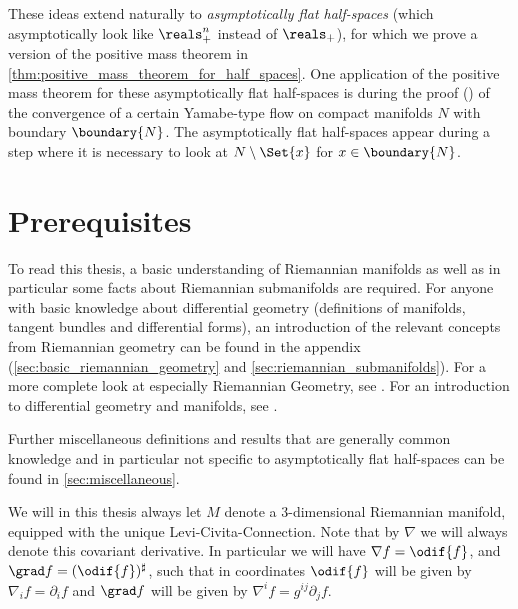 \documentclass[titlepage,numbers=noenddot,oneside,%
cleardoublepage=empty,paper=a4,fontsize=11pt,%
english,%
]{scrartcl}
\begin{document}
These ideas extend naturally to \emph{asymptotically flat half-spaces} (which asymptotically look like \( \reals^n_+ \) instead of \( \reals_+ \)), for which we prove a version of the positive mass theorem in \cref{thm:positive_mass_theorem_for_half_spaces}. One application of the positive mass theorem for these asymptotically flat half-spaces is during the proof (\cite{almarazConvergenceScalarflatMetrics2015}) of the convergence of a  certain Yamabe-type flow on compact manifolds \( N \) with boundary \( \boundary{N} \). The asymptotically flat half-spaces appear during a step where it is necessary to look at \( N\setminus \Set{x} \) for \( x\in \boundary{N} \). 

\section{Prerequisites}
To read this thesis, a basic understanding of Riemannian manifolds as well as in particular some facts about Riemannian submanifolds are required. For anyone with basic knowledge about differential geometry (definitions of manifolds, tangent bundles and differential forms), an introduction of the relevant concepts from Riemannian geometry can be found in the appendix (\cref{sec:basic_riemannian_geometry} and \cref{sec:riemannian_submanifolds}). For a more complete look at especially Riemannian Geometry, see \cite[Chapters 1 and 2]{petersenRiemannianGeometry2006}. For an introduction to differential geometry and manifolds, see \cite{leeIntroductionSmoothManifolds2012}.

Further miscellaneous definitions and results that are generally common knowledge and in particular not specific to asymptotically flat half-spaces can be found in \cref{sec:miscellaneous}.

\begin{notation}
    We will in this thesis always let \( M \) denote a 3-dimensional Riemannian manifold, equipped with the unique Levi-Civita-Connection. Note that by \( \nabla \) we will always denote this covariant derivative. In particular we will have \( \nabla f=\odif{f} \), and \( \grad f=(\odif{f})^\sharp \), such that in coordinates \( \odif{f} \) will be given by \( \nabla_i f=\partial_i f \) and \( \grad f \) will be given by \( \nabla^i f=g^{ij}\partial_j f \).
\end{notation}
\end{document}
